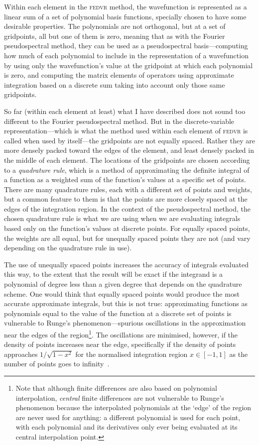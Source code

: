 Within each element in the \textsc{fedvr} method, the wavefunction is represented as a linear sum of a set of polynomial basis functions, specially chosen to have some desirable properties. The polynomials are not orthogonal, but at a set of gridpoints, all but one of them is zero, meaning that as with the Fourier pseudospectral method, they can be used as a pseudospectral basis---computing how much of each polynomial to include in the representation of a wavefunction by using only the wavefunction's value at the gridpoint at which each polynomial is zero, and computing the matrix elements of operators using approximate integration based on a discrete sum taking into account only those same gridpoints.

So far (within each element at least) what I have described does not sound too different to the Fourier pseudospectral method. But in the discrete-variable representation---which is what the method used within each element of \textsc{fedvr} is called when used by itself---the gridpoints are not equally spaced. Rather they are more densely packed toward the edges of the element, and least densely packed in the middle of each element. The locations of the gridpoints are chosen according to a \emph{quadrature rule}, which is a method of approximating the definite integral of a function as a  weighted sum of the function's values at a specific set of points. There are many quadrature rules, each with a different set of points and weights, but a common feature to them is that the points are more closely spaced at the edges of the integration region. In the context of the pseudospectral method, the chosen quadrature rule is what we are using when we are evaluating integrals based only on the function's values at discrete points. For equally spaced points, the weights are all equal, but for unequally spaced points they are not (and vary depending on the quadrature rule in use).

The use of unequally spaced points increases the accuracy of integrals evaluated this way, to the extent that the result will be exact if the integrand is a polynomial of degree less than a given degree that depends on the quadrature scheme. One would think that equally spaced points would produce the most accurate approximate integrals, but this is not true: approximating functions as polynomials equal to the value of the function at a discrete set of points is vulnerable to Runge's phenomenon---spurious oscillations in the approximation near the edges of the region\footnote{Note that although finite differences are also based on polynomial interpolation, \emph{central} finite differences are not vulnerable to Runge's phenomenon because the interpolated polynomials at the `edge' of the region are never used for anything: a different polynomial is used for each point, with each polynomial and its derivatives only ever being evaluated at its central interpolation point.}. The oscillations are minimised, however, if the density of points increases near the edge, specifically if the density of points approaches $1/\sqrt{1 - x^2}$ for the normalised integration region $x \in [-1, 1]$ as the number of points goes to infinity~\cite{berrut_barycentric_2004}. 

